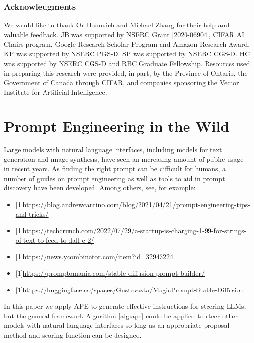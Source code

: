 \documentclass{article} %
\begin{document}
\subsubsection*{Acknowledgments}
We would like to thank Or Honovich and Michael Zhang for their help and valuable feedback. JB was supported by NSERC Grant [2020-06904], CIFAR AI Chairs program, Google Research Scholar Program and Amazon Research Award. KP was supported by NSERC PGS-D. SP was supported by NSERC CGS-D. HC was supported by NSERC CGS-D and RBC Graduate Fellowship. Resources used in preparing this research were provided, in part, by the Province of Ontario, the Government of Canada through CIFAR, and companies sponsoring the Vector Institute for Artificial Intelligence.




\newpage
\appendix

\section{Prompt Engineering in the Wild}\label{appdx_wild_prompt_engineering}
Large models with natural language interfaces, including models for text generation and image synthesis, have seen an increasing amount of public usage in recent years. As finding the right prompt can be difficult for humans, a number of guides on prompt engineering as well as tools to aid in prompt discovery have been developed. Among others, see, for example: 

\newcommand{\hscale}[1]{\scalebox{0.7}[1]{#1}}
\begin{itemize}[leftmargin=*]\footnotesize
    \item \hscale{\url{https://blog.andrewcantino.com/blog/2021/04/21/prompt-engineering-tips-and-tricks/}}
    \item \hscale{\url{https://techcrunch.com/2022/07/29/a-startup-is-charging-1-99-for-strings-of-text-to-feed-to-dall-e-2/}}
    \item \hscale{\url{https://news.ycombinator.com/item?id=32943224}}
    \item \hscale{\url{https://promptomania.com/stable-diffusion-prompt-builder/}}
    \item \hscale{\url{https://huggingface.co/spaces/Gustavosta/MagicPrompt-Stable-Diffusion}}
\end{itemize}

In this paper we apply APE to generate effective instructions for steering LLMs, but the general framework Algorithm \ref{alg:ape} could be applied to steer other models with natural language interfaces so long as an appropriate proposal method and scoring function can be designed. 






\end{document}
